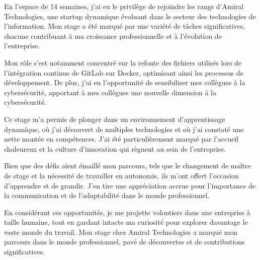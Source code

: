 En l'espace de 14 semaines, j'ai eu le privilège de rejoindre les rangs d'Amiral Technologies, une startup dynamique évoluant dans le secteur des technologies de l'information.
Mon stage a été marqué par une variété de tâches significatives, chacune contribuant à ma croissance professionnelle et à l'évolution de l'entreprise.

Mon rôle s'est notamment concentré sur la refonte des fichiers utilisés lors de l'intégration continue de GitLab sur Docker, optimisant ainsi les processus de développement.
De plus, j'ai eu l'opportunité de sensibiliser mes collègues à la cybersécurité, apportant à mes collègues une nouvelle dimension à la cybersécurité.

Ce stage m'a permis de plonger dans un environnement d'apprentissage dynamique, où j'ai découvert de multiples technologies et où j'ai constaté une nette montée en compétences.
J'ai été particulièrement marqué par l'accueil chaleureux et la culture d'innovation qui règnent au sein de l'entreprise.

Bien que des défis aient émaillé mon parcours, tels que le changement de maître de stage et la nécessité de travailler en autonomie, ils m'ont offert l'occasion d'apprendre et de grandir.
J'en tire une appréciation accrue pour l'importance de la communication et de l'adaptabilité dans le monde professionnel.

En considérant ces opportunités, je me projette volontiers dans une entreprise à taille humaine, tout en gardant intacte ma curiosité pour explorer davantage le vaste monde du travail.
Mon stage chez Amiral Technologies a marqué mon parcours dans le monde professionnel, pavé de découvertes et de contributions significatives.
